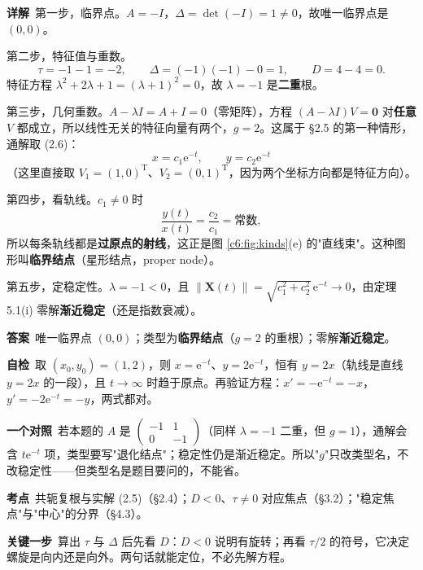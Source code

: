 \documentclass[11pt]{ctexart}
\renewcommand{\qbreak}{\needspace{0.26\textheight}}
\newcommand{\qpagebreak}{\needspace{0.92\textheight}}
\newcommand{\X}{\mathbf{X}}\newcommand{\Y}{\mathbf{Y}}
\newcommand{\norm}[1]{\left\lVert#1\right\rVert}
\begin{document}
\textbf{详解}\
第一步，临界点。$A=-I$，$\Delta=\det(-I)=1\neq0$，故唯一临界点是 $(0,0)$。

第二步，特征值与重数。
\[
\tau=-1-1=-2,\qquad \Delta=(-1)(-1)-0=1,\qquad D=4-4=0 .
\]
特征方程 $\lambda^{2}+2\lambda+1=(\lambda+1)^{2}=0$，故 $\lambda=-1$ 是\textbf{二重}根。

第三步，几何重数。$A-\lambda I=A+I=0$（零矩阵），方程 $(A-\lambda I)V=\mathbf{0}$ 对\textbf{任意} $V$ 都成立，所以线性无关的特征向量有两个，$g=2$。这属于 §2.5 的第一种情形，通解取 (2.6)：
\[
x=c_1\mathrm{e}^{-t},\qquad y=c_2\mathrm{e}^{-t}
\]
（这里直接取 $V_1=(1,0)^{\mathrm T}$、$V_2=(0,1)^{\mathrm T}$，因为两个坐标方向都是特征方向）。

第四步，看轨线。$c_1\neq0$ 时
\[
\frac{y(t)}{x(t)}=\frac{c_2}{c_1}=\text{常数},
\]
所以每条轨线都是\textbf{过原点的射线}，这正是图 \ref{c6:fig:kinds}(e) 的"直线束"。这种图形叫\textbf{临界结点}（星形结点，proper node）。

第五步，定稳定性。$\lambda=-1<0$，且 $\norm{\X(t)}=\sqrt{c_1^{2}+c_2^{2}}\,\mathrm{e}^{-t}\to0$，由定理 5.1(i) 零解\textbf{渐近稳定}（还是指数衰减）。

\textbf{答案}\ 唯一临界点 $(0,0)$；类型为\textbf{临界结点}（$g=2$ 的重根）；零解\textbf{渐近稳定}。

\textbf{自检}\ 取 $(x_0,y_0)=(1,2)$，则 $x=\mathrm{e}^{-t}$、$y=2\mathrm{e}^{-t}$，恒有 $y=2x$（轨线是直线 $y=2x$ 的一段），且 $t\to\infty$ 时趋于原点。再验证方程：$x'=-\mathrm{e}^{-t}=-x$，$y'=-2\mathrm{e}^{-t}=-y$，两式都对。

\textbf{一个对照}\ 若本题的 $A$ 是 $\begin{pmatrix}-1&1\\0&-1\end{pmatrix}$（同样 $\lambda=-1$ 二重，但 $g=1$），通解会含 $t\mathrm{e}^{-t}$ 项，类型要写"退化结点"；稳定性仍是渐近稳定。所以"$g$"只改类型名，不改稳定性——但类型名是题目要问的，不能省。

\qpagebreak
\qbreak
{}
\label{c6:app:a3}

\textbf{考点}\ 共轭复根与实解 (2.5)（§2.4）；$D<0$、$\tau\neq0$ 对应焦点（§3.2）；"稳定焦点"与"中心"的分界（§4.3）。

\textbf{关键一步}\ 算出 $\tau$ 与 $\Delta$ 后先看 $D$：$D<0$ 说明有旋转；再看 $\tau/2$ 的符号，它决定螺旋是向内还是向外。两句话就能定位，不必先解方程。
\end{document}
